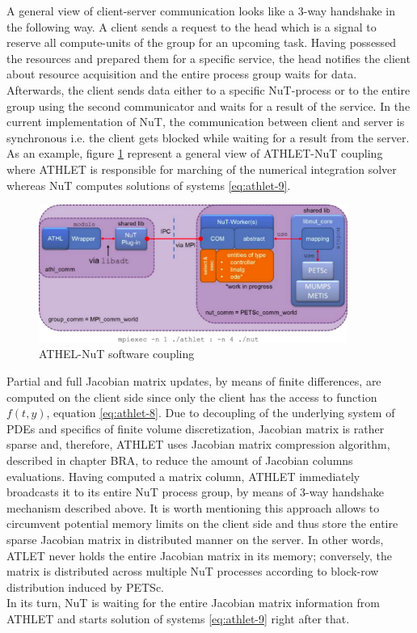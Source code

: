 A general view of client-server communication looks  like a 3-way handshake in the following way. A client sends a request to the head which is a signal to reserve all compute-units of the group for an upcoming task. Having possessed the resources and prepared them for a specific service, the head notifies the client about resource acquisition and the entire process group waits for data. Afterwards, the client sends data either to a specific NuT-process or to the entire group using the second communicator and waits for a result of the service. In the current implementation of NuT, the communication between client and server is synchronous i.e. the client gets blocked while waiting for a result from the server. \\


As an example, figure \ref{fig:introduction-athlet-nut-coupling} represent a general view of ATHLET-NuT coupling where ATHLET is responsible for marching of the numerical integration solver whereas NuT computes solutions of systems \ref{eq:athlet-9}.


\figpointer{\ref{fig:introduction-athlet-nut-coupling}}
\begin{figure}[htpb]
  \centering
  \includegraphics[width=0.9\textwidth]{figures/introduction-athlet-nut-coupling.png}
\caption{ATHEL-NuT software coupling}
\label{fig:introduction-athlet-nut-coupling}
\end{figure}


Partial and full Jacobian matrix updates, by means of finite differences, are computed on the client side since only the client has the access to function $f(t, y)$, equation \ref{eq:athlet-8}. Due to decoupling of the underlying system of PDEs and specifics of finite volume discretization, Jacobian matrix is rather sparse and, therefore, ATHLET uses Jacobian matrix compression algorithm, described in chapter BRA, to reduce the amount of Jacobian columns evaluations. Having computed a matrix column, ATHLET immediately broadcasts it to its entire NuT process group, by means of 3-way handshake mechanism described above. It is worth mentioning this approach allows to circumvent potential memory limits on the client side and thus store the entire sparse Jacobian matrix in distributed manner on the server. In other words, ATLET never holds the entire Jacobian matrix in its memory; conversely, the matrix is distributed across multiple NuT processes according to block-row distribution induced by PETSc.\\


In its turn, NuT is waiting for the entire Jacobian matrix information from ATHLET and starts solution of systems \ref{eq:athlet-9} right after that.\\


